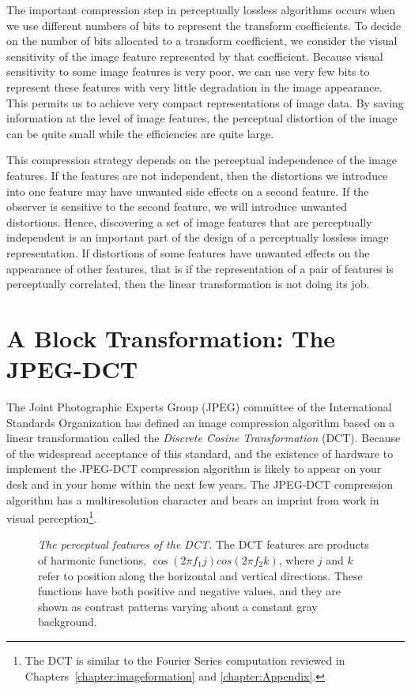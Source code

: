 The important compression step in perceptually lossless algorithms
occurs when we use different numbers of bits to represent the
transform coefficients.  To decide on the number of bits allocated to
a transform coefficient, we consider the visual sensitivity of the
image feature represented by that coefficient.  Because visual
sensitivity to some image features is very poor, we can use very few
bits to represent these features with very little degradation in the
image appearance.  This permits us to achieve very compact
representations of image data.  By saving information at the level of
image features, the perceptual distortion of the image can be quite
small while the efficiencies are quite large.

This compression strategy depends on the perceptual independence of
the image features.  If the features are not independent, then the
distortions we introduce into one feature may have unwanted side
effects on a second feature.  If the observer is sensitive to the
second feature, we will introduce unwanted distortions.  Hence,
discovering a set of image features that are perceptually independent
is an important part of the design of a perceptually lossless image
representation.  If distortions of some features have unwanted effects
on the appearance of other features, that is if the representation of
a pair of features is perceptually correlated, then the linear
transformation is not doing its job.
\section{A Block Transformation: The JPEG-DCT}
\label{sec6:dct}
%
%
The Joint Photographic Experts Group (JPEG) committee of the
International Standards Organization has defined an image compression
algorithm based on a linear transformation called the {\em Discrete
Cosine Transformation} (DCT).  Because of the widespread acceptance of
this standard, and the existence of hardware to implement the
JPEG-DCT compression algorithm is likely to appear on
your desk and in your home within the next few years.  The JPEG-DCT
compression algorithm has a multiresolution character and bears an
imprint from work in visual perception\footnote{The DCT is similar to
the Fourier Series computation reviewed in
Chapters~\ref{chapter:imageformation} and \ref{chapter:Appendix}.}.

\begin{figure}
\centerline{
}
\caption[DCT Basis Functions]{
{\em The perceptual features of the DCT.}  The DCT features are
products of harmonic functions, $\cos(2 \pi f_1 j)cos(2 \pi f_2 k)$,
where $j$ and $k$ refer to position along the horizontal and vertical
directions.  These functions have both positive and negative values,
and they are shown as contrast patterns varying about a constant gray
background.  }
\label{f7:dctBasis}
\end{figure}
	
